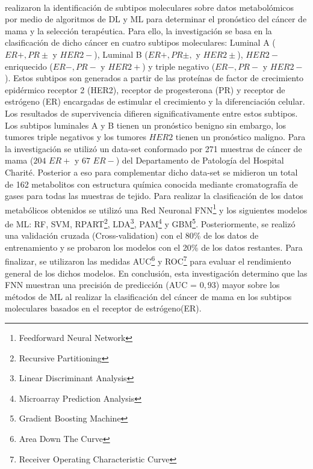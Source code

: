 \\
\cite{Alakwaa2018} realizaron la identificación de subtipos moleculares sobre datos metabolómicos por medio de algoritmos de DL y ML para determinar el pronóstico del cáncer de mama y la selección terapéutica. Para ello, la investigación se basa en la clasificación de dicho cáncer en cuatro subtipos moleculares: Luminal A ($ER +, PR \pm$ y $HER2-$), Luminal B ($ER +, PR \pm,$ y $HER2\pm$), $HER2-$ enriquecido ($ER-, PR-$ y $HER2 +$) y triple negativo ($ER-, PR-$ y $HER2 -$). Estos subtipos son generados a partir de las proteínas de factor de crecimiento epidérmico receptor 2 (HER2), receptor de progesterona (PR) y receptor de estrógeno (ER) encargadas de estimular el crecimiento y la diferenciación celular. Los resultados de supervivencia difieren significativamente entre estos subtipos. Los subtipos luminales A y B tienen un pronóstico benigno sin embargo, los tumores triple negativos y los tumores $HER2$ tienen un pronóstico maligno. Para la investigación se utilizó un data-set conformado por 271 muestras de cáncer de mama ($204$ $ER+ $ y $67$ $ER- $) del Departamento de Patología del Hospital Charité. Posterior a eso para complementar dicho data-set se midieron un total de 162 metabolitos con estructura química conocida mediante cromatografía de gases para todas las muestras de tejido. Para realizar la clasificación de los datos metabólicos obtenidos se utilizó una Red Neuronal FNN\footnote{Feedforward Neural Network} y los siguientes modelos de ML: RF, SVM, RPART\footnote{Recursive Partitioning}, LDA\footnote{Linear Discriminant Analysis}, PAM\footnote{Microarray Prediction Analysis} y GBM\footnote{Gradient Boosting Machine}. Posteriormente, se realizó una validación cruzada (Cross-validation) con el 80\% de los datos de entrenamiento y se probaron los modelos con el 20\% de los datos restantes. Para finalizar, se utilizaron las medidas AUC\footnote{Area Down The Curve} y ROC\footnote{Receiver Operating Characteristic Curve} para evaluar el rendimiento general de los dichos modelos. En conclusión, esta investigación determino que las FNN muestran una precisión de predicción (AUC = $0,93$) mayor sobre los métodos de ML al realizar la clasificación del cáncer de mama en los subtipos moleculares basados en el receptor de estrógeno(ER).

